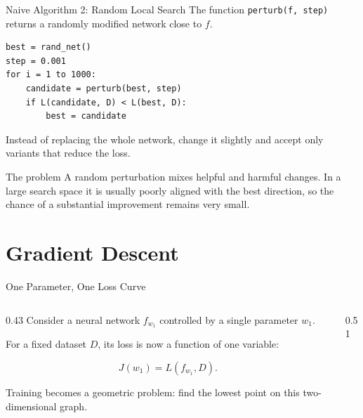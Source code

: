 \documentclass[aspectratio=169]{beamer}
\begin{document}
\begin{frame}[fragile]{{\normalsize Naive Algorithm 2: Random Local Search}}
  \small
  The function \texttt{perturb(f, step)} returns a randomly modified network
  close to $f$.

\begin{verbatim}
best = rand_net()
step = 0.001
for i = 1 to 1000:
    candidate = perturb(best, step)
    if L(candidate, D) < L(best, D):
        best = candidate
\end{verbatim}

  Instead of replacing the whole network, change it slightly and accept only
  variants that reduce the loss.

  \begin{alertblock}{The problem}
    A random perturbation mixes helpful and harmful changes. In a large search
    space it is usually poorly aligned with the best direction, so the chance
    of a substantial improvement remains very small.
  \end{alertblock}
\end{frame}

\section{Gradient Descent}

\begin{frame}{One Parameter, One Loss Curve}
  \begin{columns}[c]
    \begin{column}{0.43\textwidth}
      Consider a neural network $f_{w_1}$ controlled by a single parameter
      $w_1$.

      For a fixed dataset $D$, its loss is now a function of one variable:

      \begin{equation*}
        J(w_1) = L(f_{w_1}, D).
      \end{equation*}

      Training becomes a geometric problem: find the lowest point on this
      two-dimensional graph.
    \end{column}
    \begin{column}{0.51\textwidth}
      \centering
    \end{column}
  \end{columns}
\end{frame}
\end{document}
